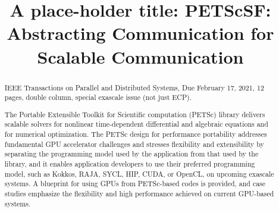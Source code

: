 \documentclass[10pt,journal,compsoc]{IEEEtran}
\newif\ifargonnereport
\begin{document}
\ifargonnereport

\fi

\title{A place-holder title:  PETScSF: Abstracting Communication for Scalable Communication}


\author{
}

\maketitle

\begin{abstract}
IEEE Transactions on Parallel and Distributed Systems, Due February 17, 2021, 12 pages, double column, special exascale issue (not just ECP).


The Portable Extensible Toolkit for Scientific computation (PETSc)
library delivers scalable solvers for
nonlinear time-dependent differential and algebraic equations and for numerical optimization.
The PETSc design for performance portability addresses fundamental GPU accelerator challenges and stresses
flexibility and extensibility by separating the
programming model
used by the application from that used by the library,
and it enables application
developers to use their preferred programming model, such as
Kokkos, RAJA, SYCL, HIP, CUDA, or OpenCL,
on upcoming exascale systems.
A blueprint for using GPUs from PETSc-based codes is provided, and 
case studies emphasize the 
flexibility and high performance achieved 
on current GPU-based systems.
\end{abstract}
\end{document}

